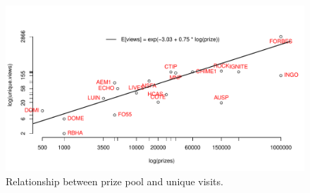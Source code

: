 \documentclass[12pt, titlepage]{article}
\begin{document}
\begin{figure}
\centering
\includegraphics{report_notes_files/figure-latex/unnamed-chunk-6-1.pdf}
\caption{Relationship between prize pool and unique visits.}
\end{figure}


\end{document}
